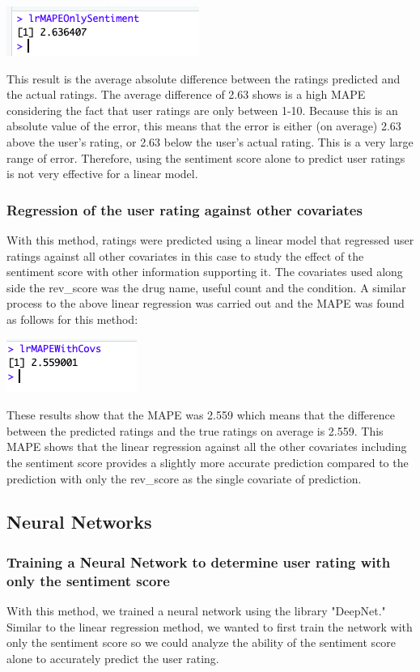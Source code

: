 \documentclass{article}
\begin{document}
\includegraphics[scale = 0.8]{linSentOnly.png}

This result is the average absolute difference between the ratings predicted and the actual ratings. The average difference of 2.63 shows is a high MAPE considering the fact that user ratings are only between 1-10. Because this is an absolute value of the error, this means that the error is either (on average) 2.63 above the user's rating, or 2.63 below the user's actual rating. This is a very large range of error. Therefore, using the sentiment score alone to predict user ratings is not very effective for a linear model.

\subsubsection{Regression of the user rating against other covariates}

With this method, ratings were predicted using a linear model that regressed user ratings against all other covariates in this case to study the effect of the sentiment score with other information supporting it. The covariates used along side the rev\_score was the drug name, useful count and the condition. A similar process to the above linear regression was carried out and the MAPE was found as follows for this method:

\includegraphics[scale = 0.8]{linCovsAll.png}

These results show that the MAPE was 2.559 which means that the difference between the predicted ratings and the true ratings on average is 2.559. This MAPE shows that the linear regression against all the other covariates including the sentiment score provides a slightly more accurate prediction compared to the prediction with only the rev\_score as the single covariate of prediction.

\subsection {Neural Networks}
\subsubsection{Training a Neural Network to determine user rating with only the sentiment score}
With this method, we trained a neural network using the library "DeepNet." Similar to the linear regression method, we wanted to first train the network with only the sentiment score so we could analyze the ability of the sentiment score alone to accurately predict the user rating. 
\end{document}
